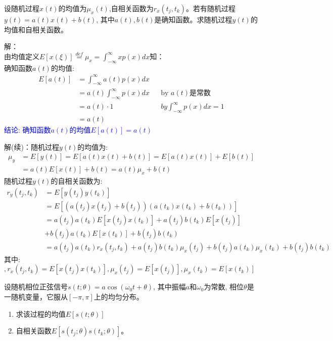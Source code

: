 \begin{frame}
\begin{example}
	设随机过程$x(t)$的均值为$\mu_x(t)$,自相关函数为$r_x(t_j,t_k)$。若有随机过程$y(t)=a(t)x(t)+b(t)$, 其中$a(t),b(t)$是确知函数。求随机过程$y(t)$的均值和自相关函数。
\end{example}
\end{frame}

\begin{frame}
解：\\
由均值定义$E[x(\xi)]\mathop{=}\limits^{def}\mu_x=\int_{-\infty}^{\infty}xp(x)dx$知：\\
确知函数$a(t)$的均值:
\begin{align*}
E[a(t)]&=\int_{-\infty}^{\infty}a(t)p(x)dx\\
&=a(t)\int_{-\infty}^{\infty}p(x)dx &&\text{by $a(t)$是常数}\\
&=a(t)\cdot 1 &&by \int_{-\infty}^{\infty}p(x)dx=1\\
&=a(t)
\end{align*}
\textcolor{blue}{结论: 确知函数$a(t)$的均值$E[a(t)]=a(t)$}
\end{frame}

\begin{frame}
解(续)：随机过程$y(t)$的均值为:
\begin{align*}
\mu_y&=E[y(t)]=E[a(t)x(t)+b(t)]=E[a(t)x(t)]+E[b(t)]\\
&=a(t)E[x(t)]+b(t)=a(t)\mu_x+b(t)
\end{align*}
随机过程$y(t)$的自相关函数为:
\begin{align*}
r_y(t_j,t_k)&=E[y(t_j)y(t_k)]\\
&=E[(a(t_j)x(t_j)+b(t_j))(a(t_k)x(t_k)+b(t_k))]\\
&=a(t_j)a(t_k)E[x(t_j)x(t_k)]+a(t_j)b(t_k)E[x(t_j)]\\
&+b(t_j)a(t_k)E[x(t_k)]+b(t_j)b(t_k)\\
&=a(t_j)a(t_k)r_x(t_j,t_k)+a(t_j)b(t_k)\mu_x(t_j)+b(t_j)a(t_k)\mu_x(t_k)+b(t_j)b(t_k)
\end{align*}
其中: $,r_x(t_j,t_k)=E[x(t_j)x(t_k)],\mu_x(t_j)=E[x(t_j)], \mu_x(t_k)=E[x(t_k)]$
\end{frame}

\begin{frame}
\begin{example}
	设随机相位正弦信号$s(t; \theta)=a\cos(\omega_0 t+\theta)$, 其中振幅$a$和$\omega_0$为常数, 相位$\theta$是一随机变量，它服从$[-\pi,\pi]$上的均匀分布。
	\begin{enumerate}
		\item 求该过程的均值$E[s(t; \theta)]$
		\item 自相关函数$E[s(t_j; \theta)s(t_k; \theta)]$。
	\end{enumerate}
\end{example}
\end{frame}

